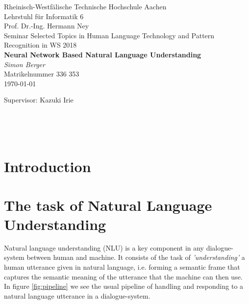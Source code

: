 \documentclass[twoside,11pt,a4paper]{article}
\theoremstyle{break}
\begin{document}
\pagestyle{empty}

\begin{center}

    Rheinisch-Westf\"alische Technische Hochschule Aachen \\
    Lehrstuhl f\"ur Informatik 6 \\
    Prof. Dr.-Ing. Hermann Ney\\[6ex]
    Seminar Selected Topics in Human Language Technology and Pattern Recognition in WS 2018\\[12ex]
   
    \LARGE
    \textbf{Neural Network Based Natural Language Understanding} \\[6ex]
    \textit{Simon Berger} \\[6ex]
    \Large
    Matrikelnummer 336 353 \\[6ex]
    \today

    \vfill
    \Large Supervisor: Kazuki Irie
	    
\end{center}

\newpage
\ 
\newpage

%
%
%
%
%
\pagestyle{headings}
\tableofcontents
\listoftables
\listoffigures
\newpage
\pagestyle{empty}
\ 
\newpage
\pagestyle{headings}

%
%
%
%
\section{Introduction}



%
%
%
%
\section{The task of Natural Language Understanding}


Natural language understanding (NLU) is a key component in any dialogue-system between human and machine. It consists of the task of \textit{'understanding'} a human utterance given in natural language, i.e. forming a semantic frame that captures the semantic meaning of the utterance that the machine can then use. In figure \ref{fig:pipeline} we see the usual pipeline of handling and responding to a natural language utterance in a dialogue-system.\par
\end{document}
